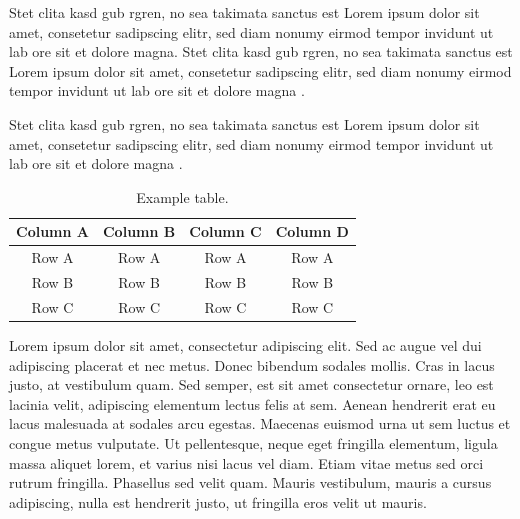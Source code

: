 \cite{TS-40561} Stet clita kasd gub rgren, no sea takimata sanctus est Lorem ipsum dolor sit amet, consetetur sadipscing elitr, sed diam nonumy eirmod tempor invidunt ut lab ore sit et dolore magna. Stet clita kasd gub rgren, no sea takimata sanctus est Lorem ipsum dolor sit amet, consetetur sadipscing elitr, sed diam nonumy eirmod tempor invidunt ut lab ore sit et dolore magna \cite{startrek,simpsondvd}. 

\citet{nelson88,moore91} Stet clita kasd gub rgren, no sea takimata sanctus est Lorem ipsum dolor sit amet, consetetur sadipscing elitr, sed diam nonumy eirmod tempor invidunt ut lab ore sit et dolore magna \citep{unesco}. 

\vspace{6pt} %
\begin{table}[!ht]
\centering
\setlength{\tabcolsep}{14pt}
\caption{Example table.}
\begin{tabular}{cccc}
\toprule\midrule
Column A & Column B & Column C & Column D \\
\midrule
Row A & Row A & Row A & Row A \\
Row B & Row B & Row B & Row B \\
Row C & Row C & Row C & Row C \\
\bottomrule
\end{tabular}
\label{table:ch4-1}
\end{table}
\vspace{-9pt} %

Lorem ipsum dolor sit amet, consectetur adipiscing elit. Sed ac augue vel dui  adipiscing placerat et nec metus. Donec bibendum sodales mollis. Cras in lacus  justo, at vestibulum quam. Sed semper, est sit amet consectetur ornare, leo est  lacinia velit, adipiscing elementum lectus felis at sem. Aenean hendrerit erat eu  lacus malesuada at sodales arcu egestas. Maecenas euismod urna ut sem luctus et  congue metus vulputate. Ut pellentesque, neque eget fringilla elementum, ligula  massa aliquet lorem, et varius nisi lacus vel diam. Etiam vitae metus sed orci  rutrum fringilla. Phasellus sed velit quam. Mauris vestibulum, mauris a cursus  adipiscing, nulla est hendrerit justo, ut fringilla eros velit ut mauris.